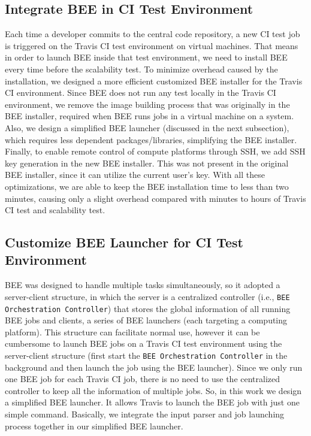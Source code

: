 

\subsection{Integrate BEE in CI Test Environment}
Each time a developer commits to the central code repository, a new CI test job is triggered on the Travis CI test environment on virtual machines. That means in order to launch BEE inside that test environment, we need to install BEE every time before the scalability test. To minimize overhead caused by the installation, we designed a more efficient customized BEE installer for the Travis CI environment. Since BEE does not run any test locally in the Travis CI environment, we remove the image building process that was originally in the BEE installer, required when BEE runs jobs in a virtual machine on a system. %
Also, we design a simplified BEE launcher (discussed in the next subsection), which requires less dependent packages/libraries, simplifying the BEE installer. Finally, to enable remote control of compute platforms through SSH, we add SSH key generation in the new BEE installer. This was not present in the original BEE installer, since it can utilize the current user's key. With all these optimizations, we are able to keep the BEE installation time to less than two minutes, causing only a slight overhead compared with minutes to hours of Travis CI test and scalability test.

\subsection{Customize BEE Launcher for CI Test Environment}
BEE was designed to handle multiple tasks simultaneously, so it adopted a server-client structure, in which the server is a centralized controller (i.e., \texttt{BEE Orchestration Controller}) that stores the global information of all running BEE jobs and clients, a series of BEE launchers (each targeting a computing platform). This structure can facilitate normal use, however it can be cumbersome to launch BEE jobs on a Travis CI test environment using the server-client structure (first start the \texttt{BEE Orchestration Controller} in the background and then launch the job using the BEE launcher).  Since we only run one BEE job for each Travis CI job, there is no need to use the centralized controller to keep all the information of multiple jobs. So, in this work we design a simplified BEE launcher. It allows Travis to launch the BEE job with just one simple command. Basically, we integrate the input parser and job launching process together in our simplified BEE launcher.

